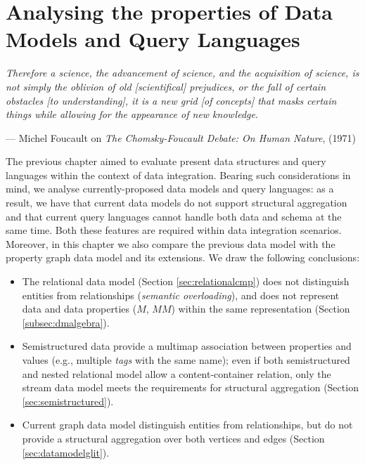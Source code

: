 \chapter{Analysing the properties of Data Models and Query Languages}\label{cha:datadef}


\epigraph{\textit{Therefore a science, the advancement of science, and the acquisition of science, is not simply the oblivion of old [scientifical] prejudices, or the fall of certain obstacles [to understanding], it is a new grid [of concepts] that masks certain things while allowing for the appearance of new knowledge}.}{--- Michel Foucault on \textit{The Chomsky-Foucault Debate: On Human Nature}, (1971)}



The previous chapter aimed to evaluate present data structures and query languages within the context of data integration. Bearing such considerations in mind, we analyse currently-proposed data models and query languages: as a result, we have that current data models do not support structural aggregation and that current query languages cannot handle both data and schema at the same time. Both these features are required within data integration scenarios. Moreover, in this chapter we also compare the previous data model with the property graph data model and its extensions. We draw the following conclusions:
\begin{itemize}
\item The relational data model (Section \ref{sec:relationalcmp}) does not distinguish entities from relationships (\textit{semantic overloading}), and does not represent data and data properties ($M$, $MM$) within the same representation (Section \ref{subsec:dmalgebra}).
\item Semistructured data provide a multimap association between properties and values (e.g., multiple \textit{tags} with the same name); even if both semistructured and nested relational model allow a content-container relation, only the stream data model meets the requirements for  structural aggregation (Section \ref{sec:semistructured}).
\item Current graph data model distinguish entities from relationships, but do not provide a structural aggregation over both vertices and edges (Section \ref{sec:datamodelglit}).
\end{itemize}


